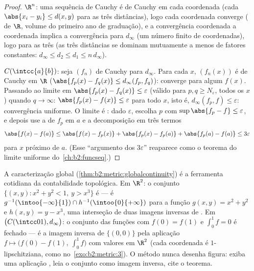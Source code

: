 \begin{proof}
$\R^n$: uma sequência de Cauchy é de Cauchy em cada coordenada (cada
$\abs{x_i - y_i} \leq d(x,y)$ para as três distâncias), logo cada
coordenada converge ( de $\R$, volume do primeiro ano de graduação), e a
convergência coordenada a coordenada implica a convergência para $d_\infty$
(um número finito de coordenadas), logo para as três (as três
distâncias se dominam mutuamente a menos de fatores constantes: $d_\infty
\leq d_2 \leq d_1 \leq n\,d_\infty$).

$C(\intcc{a}{b})$: seja $(f_n)$ de Cauchy para $d_\infty$. Para cada $x$,
$(f_n(x))$ é de Cauchy em $\R$ ($\abs{f_p(x) - f_q(x)} \leq
d_\infty(f_p, f_q)$): converge para algum $f(x)$. Passando ao
limite em $\abs{f_p(x) - f_q(x)} \leq \varepsilon$ (válido para $p, q
\geq N_\varepsilon$, todos os $x$) quando $q \to \infty$: $\abs{f_p(x) -
f(x)} \leq \varepsilon$ para todo $x$, isto é, $d_\infty(f_p, f) \leq
\varepsilon$: convergência uniforme. O limite é : dado
$\varepsilon$, escolha $p$ com $\sup\abs{f_p - f} \leq \varepsilon$,
e depois use a  de $f_p$ em $a$ e a decomposição em três termos
\[
\abs{f(x) - f(a)} \leq \abs{f(x) - f_p(x)} + \abs{f_p(x) - f_p(a)}
+ \abs{f_p(a) - f(a)} \leq 3\varepsilon
\]
para $x$ próximo de $a$. (Esse ``argumento dos $3\varepsilon$'' reaparece como
o teorema do limite uniforme do~\cref{ch:b2:funcseq}.)
\end{proof}

\begin{example}\label{ex:b2:metric:recognize}
A caracterização global
(\cref{thm:b2:metric:globalcontinuity}) é a ferramenta cotidiana da
contabilidade topológica. Em $\R^2$: o conjunto $\{(x, y) : x^2 + y^2
< 1,\ y > x^3\}$ é  --- é $g^{-1}(\intoo{-\infty}{1})
\cap h^{-1}(\intoo{0}{+\infty})$ para a função  $g(x,y) =
x^2 + y^2$ e $h(x, y) = y - x^3$, uma interseção de duas imagens inversas de
. Em $\bigl(C(\intcc01), d_\infty\bigr)$: o conjunto das
funções com $f(0) = f(1)$ e $\int_0^1 f = 0$ é fechado ---
é a imagem inversa de $\{(0,0)\}$ pela aplicação  $f \mapsto
\bigl(f(0) - f(1),\ \int_0^1 f\bigr)$ com valores em $\R^2$ (cada
coordenada é $1$-lipschitziana, como no~\cref{exo:b2:metric:3}). O
método nunca desenha figura: exiba uma aplicação , leia o
conjunto como imagem inversa, cite o teorema.
\end{example}

